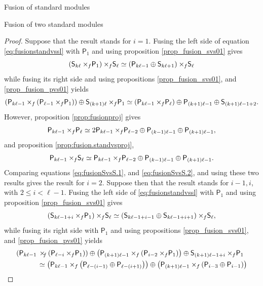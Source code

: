\documentclass[reqno]{amsart}
\newcommand{\ds}[1]{\mathsf S_{#1}}
\newcommand{\dP}[1]{\mathsf P_{#1}}
\newcommand{\xf}{\times\hspace{-0.27em}_f}
\newcommand{\lc}{\ell}
\begin{document}
\begin{section}{Fusion of standard modules}
\begin{subsection}{Fusion of two standard modules}
\begin{proof}
Suppose that the result stands for $i=1$. Fusing the left side of equation \eqref{eq:fusionstandvssl} with $\dP{1}$ and using proposition \ref{prop_fusion_svs01} gives
\begin{equation}\label{eq:fusionSvsS.1}
	\left(\ds{k \lc} \xf \dP{1}\right) \xf \ds{\lc} \simeq \left( \dP{k \lc -1} \oplus \ds{k \lc +1} \right) \xf \ds{\lc}
\end{equation}
while fusing its right side and using propositions \ref{prop_fusion_svs01}, and \ref{prop_fusion_pvs01} yields
\begin{equation}\label{eq:fusionSvsS.2}
	\left(\dP{k \lc -1} \xf\left( \dP{\lc -1} \xf \dP{1} \right)\right) \oplus \ds{(k+1)\lc} \xf \dP{1} \simeq \left( \dP{k \lc -1} \xf \dP{\lc} \right) \oplus \dP{(k+1)\lc -1} \oplus \ds{(k+1)\lc -1+2}.
\end{equation}
However, proposition \ref{prop:fusionproj} gives 
\begin{equation*}
	\dP{k \lc -1} \xf \dP{\lc}  \simeq 2\dP{k \lc -1} \xf \dP{\lc -2} \oplus \dP{(k-1) \lc -1} \oplus \dP{(k+1)\lc -1},
\end{equation*}
and proposition \ref{prop:fusion.standvsproj},
\begin{equation*}
	\dP{k \lc -1} \xf \ds{\lc} \simeq \dP{k \lc -1} \xf \dP{\lc -2} \oplus \dP{(k-1) \lc -1} \oplus \dP{(k+1)\lc -1}.
\end{equation*}
Comparing equations \eqref{eq:fusionSvsS.1}, and \eqref{eq:fusionSvsS.2}, and using these two results gives the result for $i =2$.
Suppose then that the result stands for $i-1, i$, with $2 \leq i< \lc -1$. Fusing the left side of \eqref{eq:fusionstandvssl} with $\dP{1}$ and using proposition \ref{prop_fusion_svs01} gives
\begin{equation*}
	\left(\ds{k \lc -1 +i}\xf \dP{1}\right) \xf \ds{\lc} \simeq \left(\ds{k \lc -1 + i-1} \oplus \ds{k \lc -1 + i +1} \right) \xf \ds{\lc}, 
\end{equation*}
while fusing its right side with $\dP{1}$ and using propositions \ref{prop_fusion_svs01}, and \ref{prop_fusion_pvs01} yields
\begin{align}
	\left(\dP{k \lc -1} \right. & \left. \xf \left(\dP{\lc -i}\xf \dP{1}\right)\right) \oplus \left(\dP{(k+1)\lc -1} \xf \left(\dP{i - 2} \xf \dP{1}\right)\right) \oplus \ds{(k+1)\lc -1+i}\xf \dP{1} \notag\\
	& \simeq  \left(\dP{k \lc -1} \xf \left(\dP{\lc -(i-1)} \oplus \dP{\lc - (i+1)}\right)\right) \oplus \left(\dP{(k+1)\lc -1} \xf \left(\dP{i - 3} \oplus \dP{i-1}\right)\right) \notag\\

\end{align}
\end{proof}
\end{subsection}
\end{section}
\end{document}
